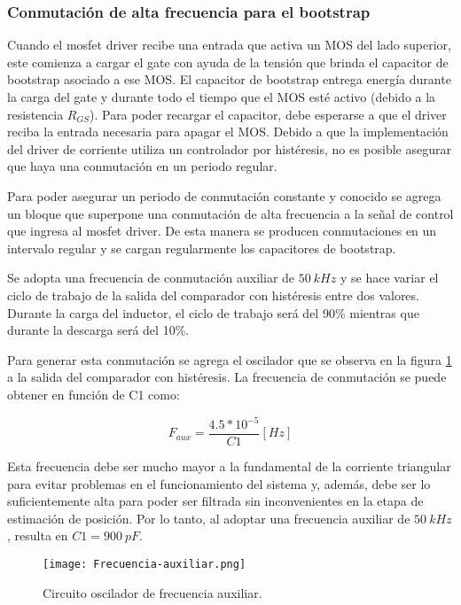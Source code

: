 \subsubsection{Conmutación de alta frecuencia para el bootstrap}

\noindent Cuando el mosfet driver recibe una entrada que activa un MOS del lado superior, este comienza a cargar el gate con ayuda de la tensión que brinda el capacitor de bootstrap asociado a ese MOS. El capacitor de bootstrap entrega energía durante la carga del gate y durante todo el tiempo que el MOS esté activo (debido a la resistencia $R_{GS}$). Para poder recargar el capacitor, debe esperarse a que el driver reciba la entrada necesaria para apagar el MOS. Debido a que la implementación del driver de corriente utiliza un controlador por histéresis, no es posible asegurar que haya una conmutación en un periodo regular.

\noindent Para poder asegurar un periodo de conmutación constante y conocido se agrega un bloque que superpone una conmutación de alta frecuencia a la señal de control que ingresa al mosfet driver. De esta manera se producen conmutaciones en un intervalo regular y se cargan regularmente los capacitores de bootstrap. 

\noindent Se adopta una frecuencia de conmutación auxiliar de $50\:kHz$ y se hace variar el ciclo de trabajo de la salida del comparador con histéresis entre dos valores. Durante la carga del inductor, el ciclo de trabajo será del 90\% mientras que durante la descarga será del 10\%.

\noindent Para generar esta conmutación se agrega el oscilador que se observa en la figura \ref{fig:img_frecuencia-auxiliar} a la salida del comparador con histéresis. La frecuencia de conmutación se puede obtener en función de C1 como:

\begin{equation} 
	F_{aux} = \frac{4.5*10^{-5}}{C1} [Hz]
\end{equation}


\noindent Esta frecuencia debe ser mucho mayor a la fundamental de la corriente triangular para evitar problemas en el funcionamiento del sistema y, además, debe ser lo suficientemente alta para poder ser filtrada sin inconvenientes en la etapa de estimación de posición. Por lo tanto, al adoptar una frecuencia auxiliar de $50\:kHz$, resulta en $C1= 900 \:pF$.

\begin{figure}[H]
	\centering
	\texttt{[image: Frecuencia-auxiliar.png]}
	\caption{Circuito oscilador de frecuencia auxiliar.}
	\label{fig:img_frecuencia-auxiliar}
\end{figure}


